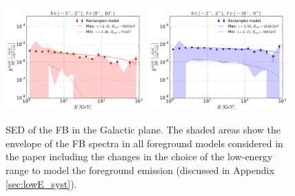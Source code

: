 \begin{figure}[h]
\centering
 \includegraphics[width=0.48\textwidth]{plots/Summary_SED_b=0_l=5.pdf}
  \includegraphics[width=0.48\textwidth]{plots/Summary_SED_b=0_l=-5.pdf}
 \caption{SED of the FB in the Galactic plane. 
 The shaded areas show the envelope of the FB spectra in all foreground models considered in the paper
including the changes in the choice of the low-energy range to model the foreground emission
(discussed in Appendix \ref{sec:lowE_syst}).}
 \label{fig:spec_summary}
\end{figure}



